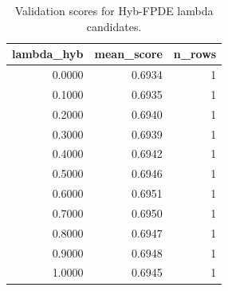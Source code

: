 \begin{table}[t]
\caption{Validation scores for Hyb-FPDE lambda candidates.}
\label{tab:lambda_distribution_computed}
\centering
\begin{tabular}{rrr}
\toprule
lambda\_hyb & mean\_score & n\_rows \\
\midrule
0.0000 & 0.6934 & 1 \\
0.1000 & 0.6935 & 1 \\
0.2000 & 0.6940 & 1 \\
0.3000 & 0.6939 & 1 \\
0.4000 & 0.6942 & 1 \\
0.5000 & 0.6946 & 1 \\
0.6000 & 0.6951 & 1 \\
0.7000 & 0.6950 & 1 \\
0.8000 & 0.6947 & 1 \\
0.9000 & 0.6948 & 1 \\
1.0000 & 0.6945 & 1 \\
\bottomrule
\end{tabular}

\end{table}

